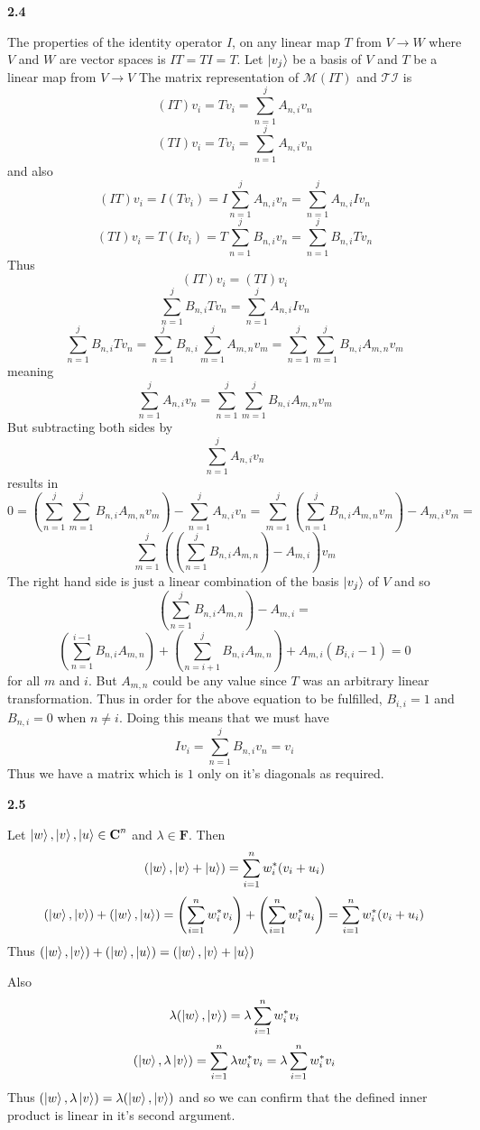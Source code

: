 \textbf{2.4}

The properties of the identity operator $I$, on any linear map $T$ from $V\to W$ where $V$ and $W$ are vector spaces is $ IT = TI = T$. Let $\ket{v_j}$ be a basis of $ V$ and $T$ be a linear map from $ V\to V$  The matrix representation of $\mathcal{M}(IT)$ and $\mathcal{TI}$ is \[ (IT)v_i = Tv_i = \sum_{n=1}^j A_{n,i}v_n\]\[(TI)v_i = Tv_i = \sum_{n=1}^j A_{n,i}v_n\] and also \[(IT)v_i = I(Tv_i) = I\sum_{n=1}^j A_{n,i}v_n = \sum_{n=1}^j A_{n,i}Iv_n\]
\[(TI)v_i = T(Iv_i) = T\sum_{n=1}^jB_{n,i}v_n = \sum_{n=1}^jB_{n,i}Tv_n\]Thus \[(IT)v_i = (TI)v_i\]
\[ \sum_{n=1}^jB_{n,i}Tv_n =  \sum_{n=1}^j A_{n,i}Iv_n\]
\[\sum_{n=1}^jB_{n,i}Tv_n  = \sum_{n=1}^jB_{n,i}\sum_{m=1}^j A_{m,n}v_m = \sum_{n=1}^j\sum_{m=1}^jB_{n,i} A_{m,n}v_m\]
meaning
\[ \sum_{n=1}^j A_{n,i}v_n= \sum_{n=1}^j\sum_{m=1}^jB_{n,i} A_{m,n}v_m\]
But subtracting both sides by  \[\sum_{n=1}^j A_{n,i}v_n \]
results in 
\[0 = \left(\sum_{n=1}^j\sum_{m=1}^jB_{n,i} A_{m,n}v_m\right)-\sum_{n=1}^j A_{n,i}v_n =\sum_{m=1}^j\left(\sum_{n=1}^jB_{n,i} A_{m,n}v_m\right)-A_{m,i}v_m = \]\[\sum_{m=1}^j\left(\left(\sum_{n=1}^jB_{n,i} A_{m,n}\right)-A_{m,i}\right)v_m \] 
The right hand side is just a linear combination of the basis $\ket{v_j}$ of $V$ and so \[ \left(\sum_{n=1}^jB_{n,i} A_{m,n}\right)-A_{m,i} = \]\[\left(\sum_{n=1}^{i-1}B_{n,i} A_{m,n}\right)+\left(\sum_{n=i+1}^{j}B_{n,i} A_{m,n}\right)+A_{m,i}(B_{i,i} -1 )=0\] for all $m$ and $i$. But $A_{m,n}$ could be any value since $T$ was an arbitrary linear transformation. Thus in order for the above equation to be fulfilled, $B_{i,i} = 1$ and $ B_{n,i} = 0$ when $n\neq i$. Doing this means that we must have \[Iv_i = \sum_{n=1}^jB_{n,i}v_n = v_i\]
Thus we have a matrix which is $1$ only on it's diagonals as required.

\textbf{2.5}

Let $\ket{w},\ket{v},\ket{u}\in \textbf{C}^n$ and $ \lambda \in\textbf{F}$. Then \[(\ket{w},\ket{v}+ \ket{u}) =\sum\limits_{i=1}^n w_i^*(v_i+u_i)\]
\[(\ket{w},\ket{v}) +(\ket{w},\ket{u}) = \left(\sum\limits_{i=1}^nw_i^*v_i\right)+\left(\sum\limits_{i=1}^nw_i^*u_i\right) = \sum\limits_{i=1}^n w_i^*(v_i+u_i)\] Thus $(\ket{w},\ket{v}) +(\ket{w},\ket{u}) = (\ket{w},\ket{v}+\ket{u})$

Also 
\[
\lambda(\ket{w},\ket{v}) = \lambda\sum\limits_{i=1}^nw_i^*v_i
\]
\[(\ket{w},\lambda\ket{v}) = \sum\limits_{i=1}^n\lambda w_i^*v_i =\lambda\sum\limits_{i=1}^n w_i^*v_i \]
Thus $(\ket{w},\lambda\ket{v}) = \lambda(\ket{w},\ket{v})$ and so we can confirm that the defined inner product is linear in it's second argument. 

